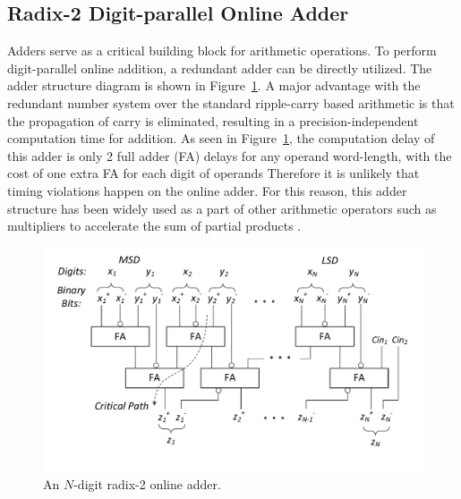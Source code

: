 \documentclass{acm_proc_article-sp}
\begin{document}
\subsection{Radix-2 Digit-parallel Online Adder}
Adders serve as a critical building block for arithmetic operations. To perform digit-parallel online addition, a redundant adder can be directly utilized. The adder structure diagram is shown in Figure~\ref{Fig:Radix2SD_adder}. A major advantage with the redundant number system over the standard ripple-carry based arithmetic is that the propagation of carry is eliminated, resulting in a precision-independent computation time for addition. As seen in Figure~\ref{Fig:Radix2SD_adder}, the computation delay of this adder is only 2 full adder (FA) delays for any operand word-length, with the cost of one extra FA for each digit of operands Therefore it is unlikely that timing violations happen on the online adder. For this reason, this adder structure has been widely used as a part of other arithmetic operators such as multipliers to accelerate the sum of partial products \cite{RedundantMult_1987,RedundantMult_1985}.
%
\begin{figure}
\includegraphics[width=.5\textwidth]{./Figures/SDAdder.pdf}
\vspace{-7ex}
\caption{An $N$-digit radix-2 online adder.}
\label{Fig:Radix2SD_adder}
\end{figure}

\end{document}
